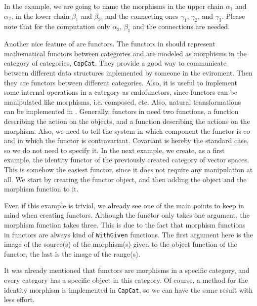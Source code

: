 In the example, we are going to name the morphisms in the upper chain $\alpha_1$ and $\alpha_2$, in the lower chain $\beta_1$ and $\beta_2$,
and the connecting ones $\gamma_1$, $\gamma_2$, and $\gamma_3$. Please note that for the computation only $\alpha_2$, $\beta_1$ and the connections
are needed.

\begin{small}
 
\end{small}

Another nice feature of \CapPkg are functors. The functors in \CapPkg should represent mathematical functors between categories and are modeled
as morphisms in the \CapPkg category of categories, \texttt{CapCat}. They provide a good way to communicate between different data structures inplemented
by someone in the \CapPkg eviroment. Then they are functors between different categories. Also, it is useful to implement some internal operations
in a category as endofunctors, since functors can be manipulated like morphisms, i.e. composed, etc. Also, natural transformations can be implemented in
\CapPkg. Generally, functors in \CapPkg need two functions, a function describing the action on the objects, and a function describing the actions on the
morphism. Also, we need to tell the system in which component the functor is co and in which the functor is contravariant. Covariant is hereby the standard
case, so we do not need to specify it.
In the next example, we create, as a first example, the identity functor of the previously created category of vector spaces. This is somehow the easiest functor,
since it does not require any manipulation at all. We start by creating the functor object, and then adding the object and the morphism function to it.

\begin{small}
 
\end{small}

Even if this example is trivial, we already see one of the main points to keep in mind when creating functors. Although the functor only takes one argument,
the morphism function takes three. This is due to the fact that morphism functions in functors are always kind of \texttt{WithGiven} functions. The first
argument here is the image of the source(s) of the morphism(s) given to the object function of the functor, the last is the image of the range(s).

It was already mentioned that functors are morphisms in a specific category, and every \CapPkg category has a specific object in this category.
Of course, a method for the identity morphism is implemented in \texttt{CapCat}, so we can have the same result with less effort.

